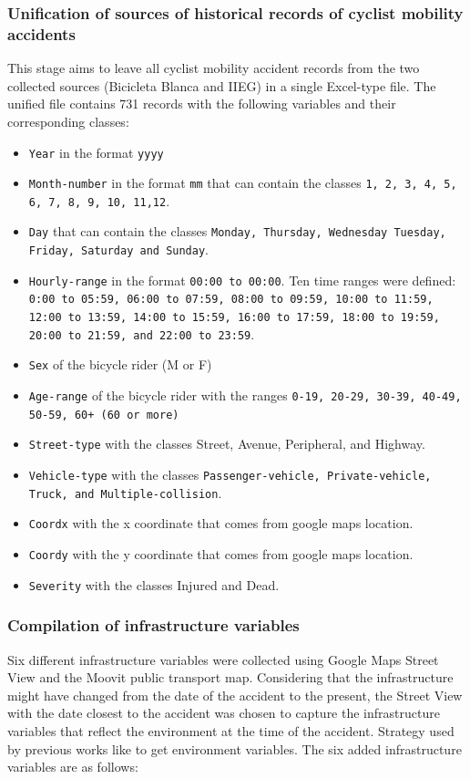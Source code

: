 \documentclass[preprint,12pt]{elsarticle}
\begin{document}
\subsubsection{Unification of sources of historical records of cyclist mobility accidents}
This stage aims to leave all cyclist mobility accident records from the two collected sources (Bicicleta Blanca and IIEG) in a single Excel-type file. The unified file contains 731 records with the following variables and their corresponding classes:

\begin{itemize}
    \item \texttt{Year} in the format \texttt{yyyy}
    \item \texttt{Month-number} in the format \texttt{mm} that can contain the classes \texttt{1, 2, 3, 4, 5, 6, 7, 8, 9, 10, 11,12}.
    \item \texttt{Day} that can contain the classes \texttt{Monday, Thursday, Wednesday Tuesday, Friday, Saturday and Sunday}.
    \item \texttt{Hourly-range} in the format \texttt{00:00 to 00:00}. Ten time ranges were defined: \texttt{0:00 to 05:59, 06:00 to 07:59, 08:00 to 09:59, 10:00 to 11:59, 12:00 to 13:59, 14:00 to 15:59, 16:00 to 17:59, 18:00 to 19:59, 20:00 to 21:59, and 22:00 to 23:59}.
    \item \texttt{Sex} of the bicycle rider (M or F)
    \item \texttt{Age-range} of the bicycle rider with the ranges \texttt{0-19, 20-29, 30-39, 40-49, 50-59, 60+ (60 or more)}
    \item \texttt{Street-type} with the classes Street, Avenue, Peripheral, and Highway.
    \item \texttt{Vehicle-type} with the classes  \texttt{Passenger-vehicle, Private-vehicle, Truck, and Multiple-collision}.
    \item \texttt{Coordx} with the x coordinate that comes from google maps location.
    \item \texttt{Coordy} with the y coordinate that comes from google maps location.
    \item \texttt{Severity} with the classes Injured and Dead.
\end{itemize}

\subsubsection{Compilation of infrastructure variables}
Six different infrastructure variables were collected using Google Maps Street View and the Moovit public transport map. Considering that the infrastructure might have changed from the date of the accident to the present, the Street View with the date closest to the accident was chosen to capture the infrastructure variables that reflect the environment at the time of the accident. Strategy used by previous works like \cite{xue_integrating_2024} to get environment variables. The six added infrastructure variables are as follows:
\end{document}
